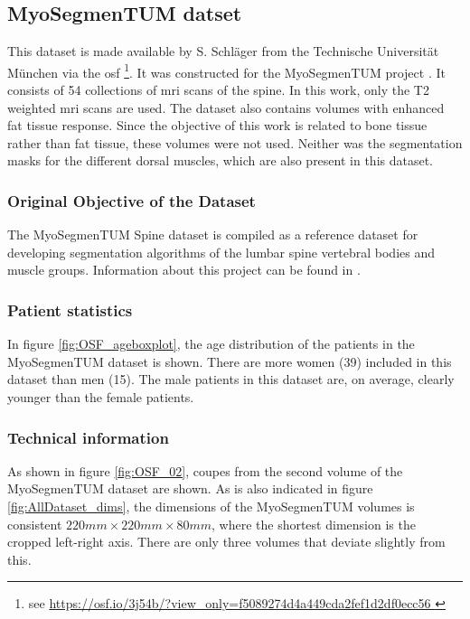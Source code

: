 \subsection{MyoSegmenTUM datset}

This dataset is made available by S. Schläger from the Technische Universität München via the \acrfull{osf} \footnote{see \url{ https://osf.io/3j54b/?view_only=f5089274d4a449cda2fef1d2df0ecc56 }}.
It was constructed for the MyoSegmenTUM project \cite{Burian2019}.
It consists of 54 collections of \acrshort{mri} scans of the spine.
In this work, only the T2 weighted \acrlong{mri} scans are used.
The dataset also contains volumes with enhanced fat tissue response. Since the objective of this work is related to bone tissue rather than fat tissue, these volumes were not used.
Neither was the segmentation masks for the different dorsal muscles, which are also present in this dataset.

\subsubsection{Original Objective of the Dataset}

The MyoSegmenTUM Spine dataset is compiled as a reference dataset for developing segmentation algorithms of the lumbar spine vertebral bodies and muscle groups.
Information about this project can be found in \cite{Burian2019}.

\subsubsection{Patient statistics}

In figure \ref{fig:OSF_ageboxplot}, the age distribution of the patients in the MyoSegmenTUM dataset is shown.
There are more women (39) included in this dataset than men (15).
The male patients in this dataset are, on average, clearly younger than the female patients.



\subsubsection{Technical information}

As shown in figure \ref{fig:OSF_02}, coupes from the second volume of the MyoSegmenTUM dataset are shown.
As is also indicated in figure \ref{fig:AllDataset_dims}, the dimensions of the MyoSegmenTUM volumes is consistent $220 mm \times 220 mm \times 80 mm$, where the shortest dimension is the cropped left-right axis.
There are only three volumes that deviate slightly from this.

